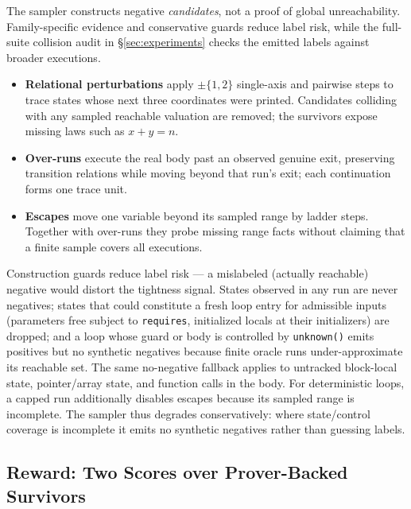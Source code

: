 The sampler constructs negative \emph{candidates}, not a proof of global unreachability.  Family-specific evidence and conservative guards reduce label risk, while the full-suite collision audit in \S\ref{sec:experiments} checks the emitted labels against broader executions.
\begin{itemize}[leftmargin=1.5em, itemsep=2pt, topsep=2pt]
\item \textbf{Relational perturbations} apply $\pm\{1,2\}$ single-axis and pairwise steps to trace states whose next three coordinates were printed.  Candidates colliding with any sampled reachable valuation are removed; the survivors expose missing laws such as $x + y = n$.
\item \textbf{Over-runs} execute the real body past an observed genuine exit, preserving transition relations while moving beyond that run's exit; each continuation forms one trace unit.
\item \textbf{Escapes} move one variable beyond its sampled range by ladder steps.  Together with over-runs they probe missing range facts without claiming that a finite sample covers all executions.
\end{itemize}
Construction guards reduce label risk --- a mislabeled (actually reachable) negative would distort the tightness signal.
States observed in any run are never negatives; states that could constitute a fresh loop entry for admissible inputs (parameters free subject to \texttt{requires}, initialized locals at their initializers) are dropped; and a loop whose guard or body is controlled by \texttt{unknown()} emits positives but no synthetic negatives because finite oracle runs under-approximate its reachable set.  The same no-negative fallback applies to untracked block-local state, pointer/array state, and function calls in the body.
For deterministic loops, a capped run additionally disables escapes because its sampled range is incomplete.
The sampler thus degrades conservatively: where state/control coverage is incomplete it emits no synthetic negatives rather than guessing labels.

\subsection{Reward: Two Scores over Prover-Backed Survivors}
\label{sec:method:reward}

